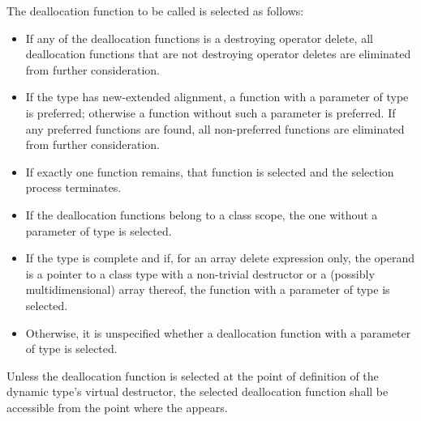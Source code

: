 \pnum
The deallocation function to be called is selected as follows:
\begin{itemize}
\item
If any of the deallocation functions is a destroying operator delete,
all deallocation functions that are not destroying operator deletes
are eliminated from further consideration.
\item
If the type has new-extended alignment,
a function with a parameter of type  is preferred;
otherwise a function without such a parameter is preferred.
If any preferred functions are found,
all non-preferred functions are eliminated from further consideration.
\item
If exactly one function remains,
that function is selected and the selection process terminates.
\item
If the deallocation functions belong to a class scope,
the one without a parameter of type  is selected.
\item
If the type is complete
and if, for an array delete expression only,
the operand is a pointer to a class type with a
non-trivial destructor or a (possibly multidimensional) array thereof,
the function with a parameter of type  is selected.
\item
Otherwise, it is unspecified
whether a deallocation function with a parameter of type 
is selected.
\end{itemize}
Unless the deallocation function is selected
at the point of definition of the dynamic type's virtual destructor,
the selected deallocation function shall be accessible
from the point where the  appears.

